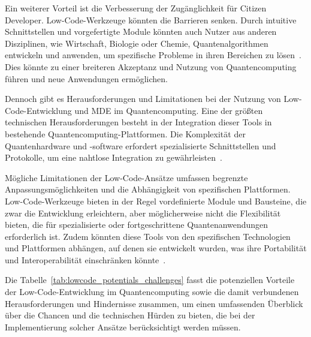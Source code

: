 Ein weiterer Vorteil ist die Verbesserung der Zugänglichkeit für Citizen Developer. Low-Code-Werkzeuge 
könnten die Barrieren senken. Durch intuitive Schnittstellen und vorgefertigte Module könnten auch Nutzer 
aus anderen Disziplinen, wie Wirtschaft, Biologie oder Chemie, Quantenalgorithmen entwickeln und 
anwenden, um spezifische Probleme in ihren Bereichen zu lösen~\cite{di2022low}. Dies könnte zu 
einer breiteren Akzeptanz und Nutzung von Quantencomputing führen und neue Anwendungen ermöglichen.

Dennoch gibt es Herausforderungen und Limitationen bei der Nutzung von Low-Code-Entwicklung und 
MDE im Quantencomputing. Eine der größten technischen Herausforderungen 
besteht in der Integration dieser Tools in bestehende Quantencomputing-Plattformen. Die Komplexität 
der Quantenhardware und -software erfordert spezialisierte Schnittstellen und Protokolle, um eine 
nahtlose Integration zu gewährleisten~\cite{monroe2013scaling}.

Mögliche Limitationen der Low-Code-Ansätze umfassen begrenzte Anpassungsmöglichkeiten und die 
Abhängigkeit von spezifischen Plattformen. Low-Code-Werkzeuge bieten in der Regel vordefinierte 
Module und Bausteine, die zwar die Entwicklung erleichtern, aber möglicherweise nicht die 
Flexibilität bieten, die für spezialisierte oder fortgeschrittene Quantenanwendungen erforderlich 
ist. Zudem könnten diese Tools von den spezifischen Technologien und Plattformen abhängen, auf denen 
sie entwickelt wurden, was ihre Portabilität und Interoperabilität einschränken könnte~\cite{nielsen2010quantum}.

Die Tabelle~\ref{tab:lowcode_potentials_challenges} fasst die potenziellen Vorteile der 
Low-Code-Entwicklung im Quantencomputing sowie die damit verbundenen Herausforderungen und Hindernisse 
zusammen, um einen umfassenden Überblick über die Chancen und die technischen Hürden zu bieten, die 
bei der Implementierung solcher Ansätze berücksichtigt werden müssen.

